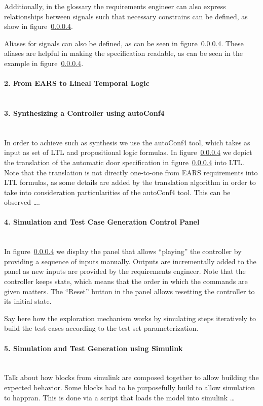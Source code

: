 Additionally, in the glossary the requirements engineer can also express
relationships between signals such that necessary constrains can be defined, as show in figure~\ref{}.

Aliases for signals can also be defined, as can be seen in figure~\ref{}. These
aliases are helpful in making the specification readable, as can be seen in the
example in figure~\ref{}.

\paragraph{2. From EARS to Lineal Temporal Logic\\\\}

\paragraph{3. Synthesizing a Controller using \textsf{autoConf4}\\\\}

In order to achieve such as synthesis we
use the \textsf{autoConf4} tool, which takes as input as set of LTL and
propositional logic formulas. In figure~\ref{} we depict the translation of the
automatic door specification in figure~\ref{} into LTL. Note that the
translation is not directly one-to-one from EARS requirements into LTL formulas,
as some details are added by the translation algorithm in order to take into
consideration particularities of the \textsf{autoConf4} tool. This can be
observed \ldots.

\paragraph{4. Simulation and Test Case Generation Control Panel\\\\}

 In figure~\ref{} we display the panel that allows ``playing'' the
controller by providing a sequence of inputs manually. Outputs are incrementally
added to the panel as new inputs are provided by the requirements engineer.
Note that the controller keeps state, which means that the order in which the commands are given matters.
The ``Reset'' button in the panel allows resetting the controller to its initial
state.

Say here how the exploration mechanism works by simulating steps iteratively to
build the test cases according to the test set parameterization.

\paragraph{5. Simulation and Test Generation using Simulink\\\\}

Talk about how blocks from simulink are composed together to allow building the
expected behavior. Some blocks had to be purposefully build to allow simulation
to happran. This is done via a script that loads the model into simulink \ldots
